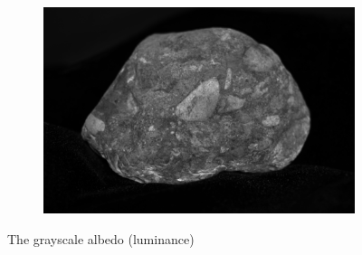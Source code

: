 \documentclass{paper}
\begin{document}
\begin{figure}[h!]
\begin{subfigure}{0.3\textwidth}
        \end{subfigure}
        ~ 
        \begin{subfigure}{0.3\textwidth}
                \includegraphics[width=\textwidth]{report_fig/rock_a}
        \end{subfigure}
        \caption{The grayscale albedo (luminance)}
        \label{fig:grayscale_albedo}
\end{figure}
\end{document}
